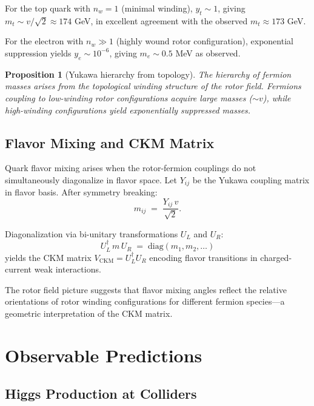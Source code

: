 \documentclass[11pt,a4paper]{article}
\theoremstyle{definition}
\theoremstyle{plain}
\newtheorem{proposition}{Proposition}
\theoremstyle{remark}
\begin{document}
For the top quark with $n_w = 1$ (minimal winding), $y_t \sim 1$, giving $m_t \sim v/\sqrt{2} \approx 174$ GeV, in excellent agreement with the observed $m_t \approx 173$ GeV.

For the electron with $n_w \gg 1$ (highly wound rotor configuration), exponential suppression yields $y_e \sim 10^{-6}$, giving $m_e \sim 0.5$ MeV as observed.

\begin{proposition}[Yukawa hierarchy from topology]
The hierarchy of fermion masses arises from the topological winding structure of the rotor field. Fermions coupling to low-winding rotor configurations acquire large masses ($\sim v$), while high-winding configurations yield exponentially suppressed masses.
\end{proposition}

\subsection{Flavor Mixing and CKM Matrix}

Quark flavor mixing arises when the rotor-fermion couplings do not simultaneously diagonalize in flavor space. Let $Y_{ij}$ be the Yukawa coupling matrix in flavor basis. After symmetry breaking:
\begin{equation}
  m_{ij} \;=\; \frac{Y_{ij}\,v}{\sqrt{2}}.
\end{equation}

Diagonalization via bi-unitary transformations $U_L$ and $U_R$:
\begin{equation}
  U_L^\dagger\, m\, U_R \;=\; \mathrm{diag}(m_1, m_2, \ldots)
\end{equation}
yields the CKM matrix $V_{\text{CKM}} = U_L^\dagger U_R$ encoding flavor transitions in charged-current weak interactions.

The rotor field picture suggests that flavor mixing angles reflect the relative orientations of rotor winding configurations for different fermion species---a geometric interpretation of the CKM matrix.

\vspace{1em}

\section{Observable Predictions}\label{sec:predictions}

\subsection{Higgs Production at Colliders}
\end{document}
